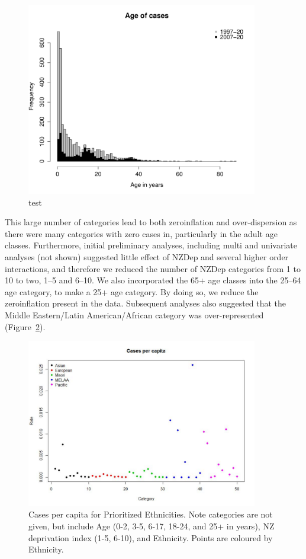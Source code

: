 \documentclass{article}
\begin{document}
\begin{figure}
     \centering
     \includegraphics[width=0.9\textwidth]{AgeCases.pdf}
     \caption{test}
     \label{fig:agecases}
\end{figure}

This large number of categories lead to both zeroinflation and over-dispersion as there were many categories with zero cases in, particularly in the adult age classes. Furthermore, initial preliminary analyses, including multi and univariate analyses (not shown) suggested little effect of NZDep and several higher order interactions, and therefore we reduced the number of NZDep categories from 1 to 10 to two, 1--5 and 6--10. We also incorporated the 65+ age classes into the 25--64 age category, to make a 25+ age category. By doing so, we reduce the zeroinflation present in the data. Subsequent analyses also suggested that the Middle Eastern/Latin American/African category was over-represented (Figure~\ref{fig:percap}).

\begin{figure}
     \centering
     \includegraphics[width=0.9\textwidth]{PerCapitaCases.pdf}
     \caption{Cases per capita for Prioritized Ethnicities. Note categories are not given, but include Age (0-2, 3-5, 6-17, 18-24, and 25+ in years), NZ deprivation index (1-5, 6-10), and Ethnicity. Points are coloured by Ethnicity.}
     \label{fig:percap}
\end{figure}
\end{document}
